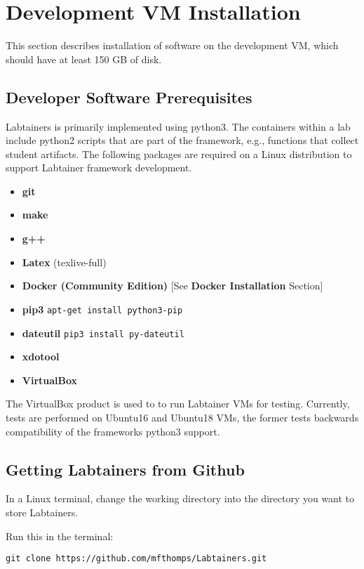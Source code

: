 \documentclass[12pt]{article}
\begin{document}
\section{Development VM Installation}
This section describes installation of software on the development VM, which should have at least 150 GB
of disk.
\subsection{Developer Software Prerequisites}
Labtainers is primarily implemented using python3.  The containers within a lab include python2 scripts that are
part of the framework, e.g., functions that collect student artifacts.  The following packages are required on a
Linux distribution to support Labtainer framework development.
\begin {itemize}
\item {\bf git}
\item {\bf make}
\item {\bf g++}
\item {\bf Latex} (texlive-full)
\item {\bf Docker (Community Edition)} [See {\bf Docker Installation} Section]
\item {\bf pip3} {\tt apt-get install python3-pip}
\item {\bf dateutil} {\tt pip3 install py-dateutil}
\item {\bf xdotool} 
\item {\bf VirtualBox} 
\end {itemize}

The VirtualBox product is used to to run Labtainer VMs for testing.  Currently, tests are performed on 
Ubuntu16 and Ubuntu18 VMs, the former tests backwards compatibility of the frameworks python3 support.

\subsection{Getting Labtainers from Github}

In a Linux terminal, change the working directory into the directory you want to store Labtainers.
\begin{flushleft} Run this in the terminal: \end{flushleft}
\begin{center} {\tt git clone https://github.com/mfthomps/Labtainers.git} \end{center} 
\end{document}

